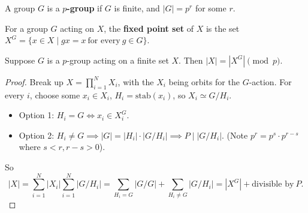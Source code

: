 \begin{definition}[]
    A group $G$ is a $p$\textbf{-group} if $G$ is finite, and $|G|=p^r$ for some $r$.
\end{definition}
\begin{definition}[]
    For a group $G$ acting on $X$, the \textbf{fixed point set} of $X$ is the set $X^G= \{x \in X \mid gx=x \ \text{for every} \ g \in G\} $.
\end{definition}
\begin{lemma}
    Suppose $G$ is a $p$-group acting on a finite set $X$. Then $|X|=|X^G| \pmod p$. 
\end{lemma}
\begin{proof}
    Break up $X= \prod _{i=1}^N X_i $, with the $X_i $ being orbits for the $G$-action. For every $i$, choose some $x_i  \in X_i $, $H_i =\mathrm{stab}(x_i )$, so $X_i  \simeq  G/ H _i $. 
    \begin{itemize}
    \setlength\itemsep{-.2em}
\item Option 1: $H_i =G \iff x_i  \in X_i ^G$.
    \item Option 2: $H_i  \neq G \implies |G|=|H_i | \cdot |G/ H_i |\implies P \mid  |G /H _i |$. (Note $p^r=p^s\cdot p^{r-s}$ where $s<r, r-s>0$).
    \end{itemize}
    So 
    \[
    |X|= \sum _{i=1}^N |X_i | \sum _{i=1}^N |G /H_i |=\sum _{H_i =G}|G  / G|+\sum _{H_i \neq G}| G/ H _i |= |X^G| + \text{divisible by} \ P.
    \] 
\end{proof}
